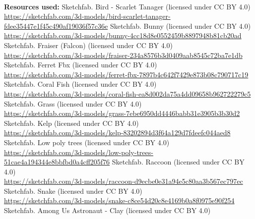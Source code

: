 \documentclass{article}
\begin{document}
\begin{thebibliography}{9}
        \textbf{\\ Resources used:}
        Sketchfab. Bird - Scarlet Tanager (licensed under CC BY 4.0) \\
        \url{https://sketchfab.com/3d-models/bird-scarlet-tanager-fdee35447e1f45c490af19036f57c36e}
        Sketchfab. Bunny (licensed under CC BY 4.0) \\
        \url{https://sketchfab.com/3d-models/bunny-4cc18d8e0552459b8897948b81cb20ad}
        Sketchfab. Fraiser (Falcon) (licensed under CC BY 4.0) \\
        \url{https://sketchfab.com/3d-models/fraiser-234a8576b3d0409aab8545c72ba7e1db}
        Sketchfab. Ferret Fbx (licensed under CC BY 4.0) \\
        \url{https://sketchfab.com/3d-models/ferret-fbx-7897b4c642f7429e873b08c790717c19}
        Sketchfab. Coral Fish (licensed under CC BY 4.0) \\
        \url{https://sketchfab.com/3d-models/coral-fish-ea8d002da75a4dd09658b962722279c5}
        Sketchfab. Grass (licensed under CC BY 4.0) \\
        \url{https://sketchfab.com/3d-models/grass-7ebe6950dd4446babb31e3905b3b30d2}
        Sketchfab. Kelp (licensed under CC BY 4.0) \\
        \url{https://sketchfab.com/3d-models/kelp-83202894d3f64a129d7fdeefc044aed8}
        Sketchfab. Low poly trees (licensed under CC BY 4.0) \\
        \url{https://sketchfab.com/3d-models/low-poly-trees-51cae4a194344e8bbfbd0a4cff205f76}
        Sketchfab. Raccoon (licensed under CC BY 4.0) \\
        \url{https://sketchfab.com/3d-models/raccoon-d9ecbe0e31a94e5c80aa3b567ec797ec}
        Sketchfab. Snake (licensed under CC BY 4.0) \\
        \url{https://sketchfab.com/3d-models/snake-c8ce54d20c8e4169b0a8f0975e90f254}
        Sketchfab. Among Us Astronaut - Clay (licensed under CC BY 4.0) \\

\end{thebibliography}
\end{document}

